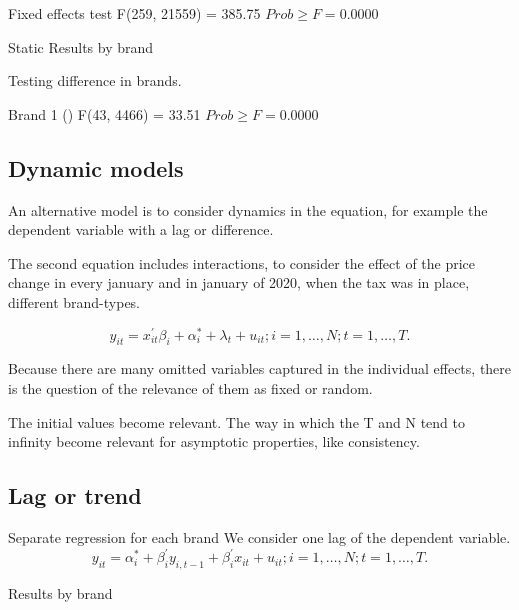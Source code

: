 \documentclass[]{article}
\begin{document}
Fixed effects test
F(259, 21559) =  385.75
$Prob \geq F =    0.0000$

Static Results by brand 

\begin{landscape}

\end{landscape}

%

Testing difference in brands.

Brand 1 ()
 F(43, 4466) = 33.51                   
$ Prob \geq F = 0.0000 $

%
 
\subsection{Dynamic models}
An alternative model is to consider dynamics in the equation, for example the dependent variable with a lag or difference. 

The second equation includes interactions, to consider the effect of the price change in every january and in january of 2020, when the tax was in place, different brand-types.

\begin{equation*}
	y_{it} = x_{it}^{'} \beta_{i} + \alpha_{i}^{*} + \lambda_{t} + u_{it}; i = 1,\ldots,N; t=1,\ldots,T.
\end{equation*}

Because there are many omitted variables captured in the individual effects, there is the question of the relevance of them as fixed or random.

The initial values become relevant.
The way in which the T and N tend to infinity become relevant for asymptotic properties, like consistency.



\subsection{Lag or trend }
Separate regression for each brand
We consider one lag of the dependent variable.
\begin{equation*}
	y_{it} = \alpha_{i}^{*} + \beta_{i}^{'}y_{i,t-1}  + \beta_{i}^{'}x_{it} + u_{it}; i = 1,\ldots,N; t=1,\ldots,T.
\end{equation*}

Results by brand

\begin{landscape}
	
\end{landscape}
\end{document}
